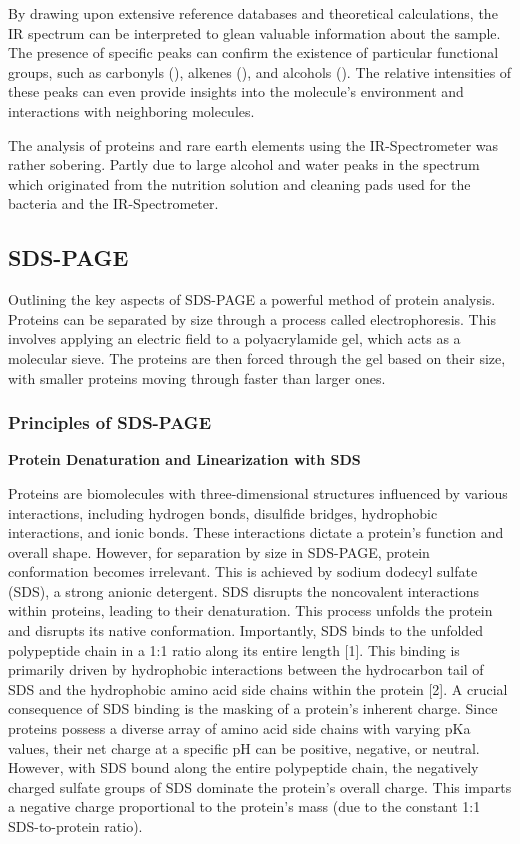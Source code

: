 By drawing upon extensive reference databases and theoretical calculations, the IR spectrum
can be interpreted to glean valuable information about the sample.
The presence of specific peaks can confirm the existence of particular functional groups, such as carbonyls (), alkenes (), and alcohols ().
The relative intensities of these peaks can even provide insights into the molecule's environment and interactions with neighboring molecules.

The analysis of proteins and rare earth elements using the IR-Spectrometer was rather
sobering.
Partly due to large alcohol and water peaks in the spectrum which originated from the nutrition solution and cleaning pads used for the bacteria and the IR-Spectrometer.

\subsection{SDS-PAGE\authorB}
Outlining the key aspects of SDS-PAGE a powerful method of protein analysis. Proteins can be
separated by size through a process called electrophoresis. This involves applying an electric
field to a polyacrylamide gel, which acts as a molecular sieve. The proteins are then forced
through the gel based on their size, with smaller proteins moving through faster than larger
ones.

\subsubsection{Principles of SDS-PAGE}

\textbf{Protein Denaturation and Linearization with SDS}

Proteins are biomolecules with three-dimensional structures influenced by various
interactions, including hydrogen bonds, disulfide bridges, hydrophobic interactions, and
ionic bonds. These interactions dictate a protein's function and overall shape. However,
for separation by size in SDS-PAGE, protein conformation becomes irrelevant. This is
achieved by sodium dodecyl sulfate (SDS), a strong anionic detergent.
SDS disrupts the noncovalent interactions within proteins, leading to their denaturation.
This process unfolds the protein and disrupts its native conformation. Importantly, SDS
binds to the unfolded polypeptide chain in a 1:1 ratio along its entire length [1]. This
binding is primarily driven by hydrophobic interactions between the hydrocarbon tail of
SDS and the hydrophobic amino acid side chains within the protein [2].
A crucial consequence of SDS binding is the masking of a protein's inherent charge. Since
proteins possess a diverse array of amino acid side chains with varying pKa values, their
net charge at a specific pH can be positive, negative, or neutral. However, with SDS bound
along the entire polypeptide chain, the negatively charged sulfate groups of SDS
dominate the protein's overall charge. This imparts a negative charge proportional to the
protein's mass (due to the constant 1:1 SDS-to-protein ratio).

